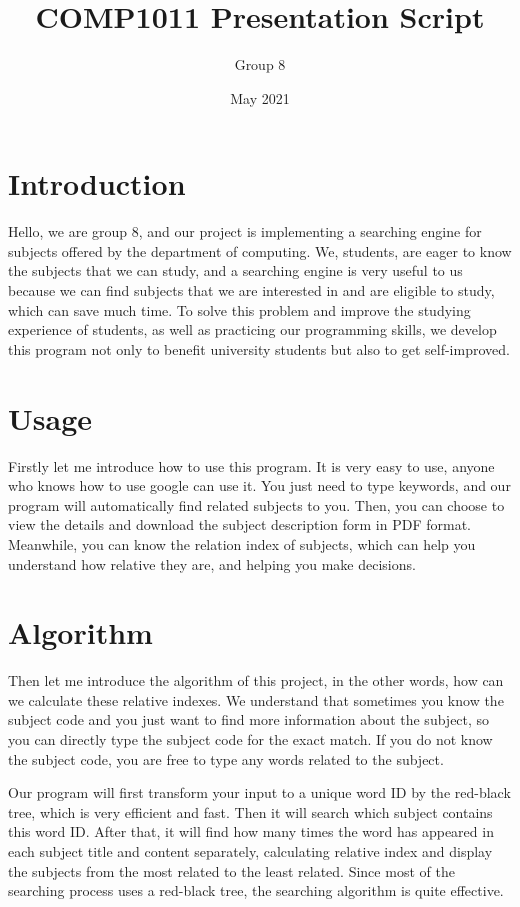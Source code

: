 \documentclass{article}
\title{COMP1011 Presentation Script}
\author{Group 8 }
\date{May 2021}
\begin{document}
\maketitle


\section{Introduction}
Hello, we are group 8, and our project is implementing a searching engine for subjects offered by the department of computing. We, students, are eager to know the subjects that we can study, and a searching engine is very useful to us because we can find subjects that we are interested in and are eligible to study, which can save much time. To solve this problem and improve the studying experience of students, as well as practicing our programming skills, we develop this program not only to benefit university students but also to get self-improved.

\section{Usage}
Firstly let me introduce how to use this program. It is very easy to use, anyone who knows how to use google can use it. You just need to type keywords, and our program will automatically find related subjects to you. Then, you can choose to view the details and download the subject description form in PDF format. Meanwhile, you can know the relation index of subjects, which can help you understand how relative they are, and helping you make decisions. 

\section{Algorithm}
Then let me introduce the algorithm of this project, in the other words, how can we calculate these relative indexes. We understand that sometimes you know the subject code and you just want to find more information about the subject, so you can directly type the subject code for the exact match. If you do not know the subject code, you are free to type any words related to the subject. 

Our program will first transform your input to a unique word ID by the red-black tree, which is very efficient and fast. Then it will search which subject contains this word ID. After that, it will find how many times the word has appeared in each subject title and content separately, calculating relative index and display the subjects from the most related to the least related. Since most of the searching process uses a red-black tree, the searching algorithm is quite effective.
\end{document}
